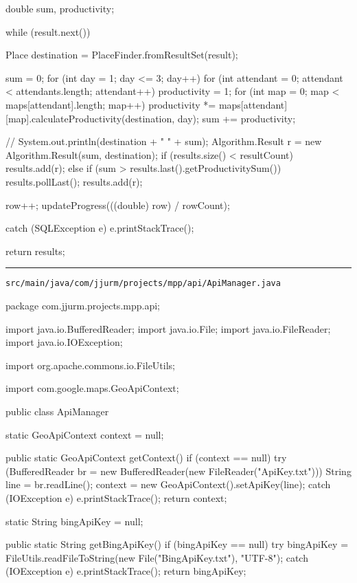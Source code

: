 \begin{javacode}
{{{      double sum, productivity;

      while (result.next()) {
        Place destination = PlaceFinder.fromResultSet(result);

        sum = 0;
        for (int day = 1; day <= 3; day++) {
          for (int attendant = 0; attendant < attendants.length; attendant++) {
            productivity = 1;
            for (int map = 0; map < maps[attendant].length; map++) {
              productivity *= maps[attendant][map].calculateProductivity(destination, day);
            }
            sum += productivity;
          }
        }

        // System.out.println(destination + " " + sum);
        Algorithm.Result r = new Algorithm.Result(sum, destination);
        if (results.size() < resultCount) {
          results.add(r);
        } else if (sum > results.last().getProductivitySum()) {
          results.pollLast();
          results.add(r);
        }

        row++;
        updateProgress(((double) row) / rowCount);

      }

    } catch (SQLException e) {
      e.printStackTrace();
    }

    return results;
  }

}
\end{javacode}

\noindent\rule{\textwidth}{0.4pt}

\nointerlineskip
\texttt{src/main/java/com/jjurm/projects/mpp/api/ApiManager.java}

\begin{javacode}
package com.jjurm.projects.mpp.api;

import java.io.BufferedReader;
import java.io.File;
import java.io.FileReader;
import java.io.IOException;

import org.apache.commons.io.FileUtils;

import com.google.maps.GeoApiContext;

public class ApiManager {

  static GeoApiContext context = null;

  public static GeoApiContext getContext() {
    if (context == null) {
      try (BufferedReader br = new BufferedReader(new FileReader("ApiKey.txt"))) {
        String line = br.readLine();
        context = new GeoApiContext().setApiKey(line);
      } catch (IOException e) {
        e.printStackTrace();
      }
    }
    return context;
  }

  static String bingApiKey = null;

  public static String getBingApiKey() {
    if (bingApiKey == null) {
      try {
        bingApiKey = FileUtils.readFileToString(new File("BingApiKey.txt"), "UTF-8");
      } catch (IOException e) {
        e.printStackTrace();
      }
    }
    return bingApiKey;
  }

}
\end{javacode}

